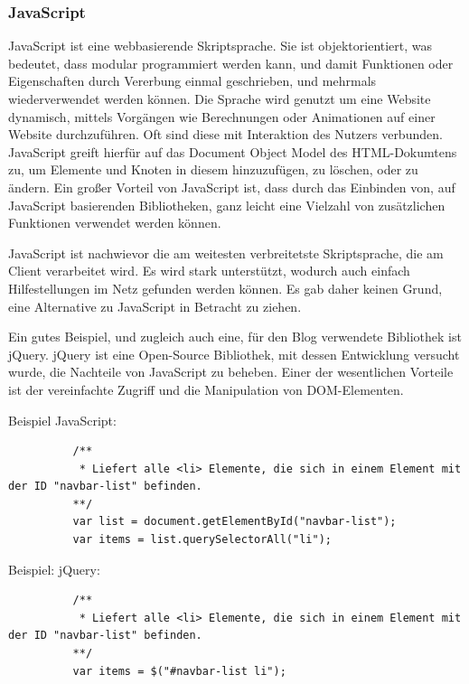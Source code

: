       \subsubsection*{JavaScript}
      {JavaScript\cite{javascript}} ist eine webbasierende Skriptsprache. Sie ist objektorientiert, was bedeutet, dass modular programmiert werden kann, und damit Funktionen oder Eigenschaften
      durch Vererbung einmal geschrieben, und mehrmals wiederverwendet werden können. Die Sprache wird genutzt um eine Website dynamisch, mittels Vorgängen wie Berechnungen oder Animationen auf einer Website durchzuführen.
      Oft sind diese mit Interaktion des Nutzers verbunden. JavaScript greift hierfür auf das Document Object Model des HTML-Dokumtens zu, um Elemente und Knoten in diesem hinzuzufügen, zu löschen, oder
      zu ändern. Ein großer Vorteil von JavaScript ist, dass durch das Einbinden von, auf JavaScript basierenden Bibliotheken, ganz leicht eine Vielzahl von zusätzlichen Funktionen
      verwendet werden können.

      JavaScript ist nachwievor die am weitesten verbreitetste Skriptsprache, die am Client verarbeitet wird. Es wird stark unterstützt, wodurch auch einfach Hilfestellungen im Netz
      gefunden werden können. Es gab daher keinen Grund, eine Alternative zu JavaScript in Betracht zu ziehen.

      Ein gutes Beispiel, und zugleich auch eine, für den Blog verwendete Bibliothek ist {jQuery\cite{jquery}}.
      jQuery ist eine Open-Source Bibliothek, mit dessen Entwicklung versucht wurde, die Nachteile von JavaScript zu beheben. Einer der wesentlichen Vorteile ist
      der vereinfachte Zugriff und die Manipulation von DOM-Elementen.

      Beispiel JavaScript:

      \lstset{language=javascript}
      	\begin{lstlisting}
          /**
           * Liefert alle <li> Elemente, die sich in einem Element mit der ID "navbar-list" befinden.
          **/
          var list = document.getElementById("navbar-list");
          var items = list.querySelectorAll("li");
      	\end{lstlisting}

      Beispiel: jQuery:

      \lstset{language=javascript}
      	\begin{lstlisting}
          /**
           * Liefert alle <li> Elemente, die sich in einem Element mit der ID "navbar-list" befinden.
          **/
          var items = $("#navbar-list li");
      	\end{lstlisting}

